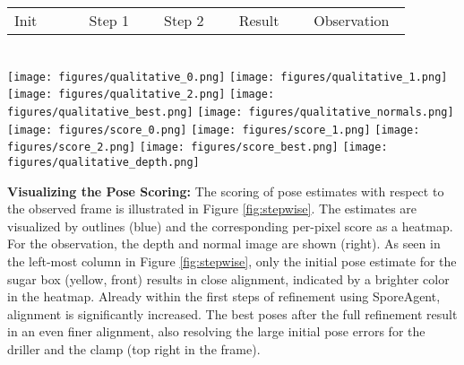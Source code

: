 \documentclass[10pt,twocolumn,letterpaper]{article}
\begin{document}
\begin{figure*}[t]
    \centering
    \begin{tabular}{>{\centering\arraybackslash}p{0.173\linewidth}>{\centering\arraybackslash}p{0.173\linewidth}>{\centering\arraybackslash}p{0.173\linewidth}>{\centering\arraybackslash}p{0.173\linewidth}>{\centering\arraybackslash}p{0.19\linewidth}}
    Init & Step 1 & Step 2 & Result & Observation
    \end{tabular}\\
    \texttt{[image: figures/qualitative\_0.png]} 
    \texttt{[image: figures/qualitative\_1.png]} 
    \texttt{[image: figures/qualitative\_2.png]} 
    \texttt{[image: figures/qualitative\_best.png]} \hspace{1ex} 
    \texttt{[image: figures/qualitative\_normals.png]}\\
    \texttt{[image: figures/score\_0.png]} 
    \texttt{[image: figures/score\_1.png]} 
    \texttt{[image: figures/score\_2.png]} 
    \texttt{[image: figures/score\_best.png]} \hspace{1ex}
    \texttt{[image: figures/qualitative\_depth.png]}
    \caption{Qualitative step-by-step example with (from left to right) initialization, first two steps and the final result after 10 iterations. The inputs -- the observed normal and depth image -- are shown in the last column. In the corresponding error images used for scoring (bottom row) a brighter color indicates a higher alignment between estimate and observation. ADD/ADI are the mean over per-object distances.}
    \label{fig:stepwise}
\end{figure*}

\textbf{Visualizing the Pose Scoring: }The scoring of pose estimates with respect to the observed frame is illustrated in Figure \ref{fig:stepwise}. The estimates are visualized by outlines (blue) and the corresponding per-pixel score as a heatmap. For the observation, the depth and normal image are shown (right). %
As seen in the left-most column in Figure \ref{fig:stepwise}, only the initial pose estimate for the sugar box (yellow, front) results in close alignment, indicated by a brighter color in the heatmap. Already within the first steps of refinement using SporeAgent, alignment is significantly increased. The best poses after the full refinement result in an even finer alignment, also resolving the large initial pose errors for the driller and the clamp (top right in the frame).
\end{document}
